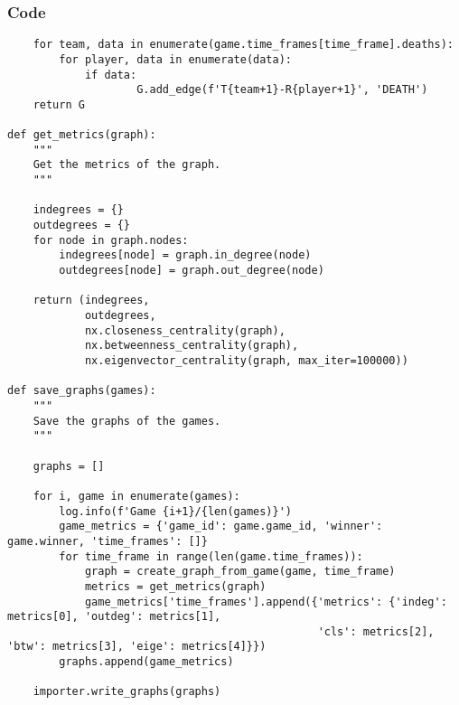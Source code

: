 \documentclass{beamer}
\begin{document}
\begin{frame}[t, fragile]
    \frametitle{Code}
    \fontsize{3pt}{5pt}\selectfont
    \begin{verbatim}
    for team, data in enumerate(game.time_frames[time_frame].deaths):
        for player, data in enumerate(data):
            if data:
                    G.add_edge(f'T{team+1}-R{player+1}', 'DEATH')
    return G

def get_metrics(graph):
    """
    Get the metrics of the graph.
    """
    
    indegrees = {}
    outdegrees = {}
    for node in graph.nodes:
        indegrees[node] = graph.in_degree(node)
        outdegrees[node] = graph.out_degree(node)
    
    return (indegrees,
            outdegrees,
            nx.closeness_centrality(graph),
            nx.betweenness_centrality(graph),
            nx.eigenvector_centrality(graph, max_iter=100000))

def save_graphs(games):
    """
    Save the graphs of the games.
    """

    graphs = []

    for i, game in enumerate(games):
        log.info(f'Game {i+1}/{len(games)}')
        game_metrics = {'game_id': game.game_id, 'winner': game.winner, 'time_frames': []}
        for time_frame in range(len(game.time_frames)):
            graph = create_graph_from_game(game, time_frame)
            metrics = get_metrics(graph)
            game_metrics['time_frames'].append({'metrics': {'indeg': metrics[0], 'outdeg': metrics[1],
                                                'cls': metrics[2], 'btw': metrics[3], 'eige': metrics[4]}})
        graphs.append(game_metrics)

    importer.write_graphs(graphs)
    \end{verbatim}
\end{frame}

\end{document}
